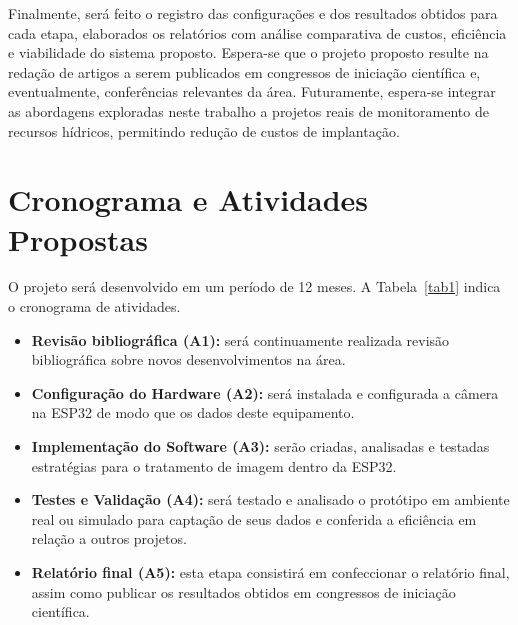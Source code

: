 \documentclass[12pt]{article}
\begin{document}
\begin{spacing}{1}
Finalmente, será feito o registro das configurações e dos resultados obtidos para cada etapa, elaborados os relatórios com análise comparativa de custos, eficiência e viabilidade do sistema proposto.
Espera-se que o projeto proposto resulte na redação de artigos a serem publicados em congressos de iniciação científica e, eventualmente, conferências relevantes da área. Futuramente, espera-se integrar as abordagens exploradas neste trabalho a projetos reais de monitoramento de recursos hídricos, permitindo redução de custos de implantação.

\section{Cronograma e Atividades Propostas}
O projeto será desenvolvido em um período de 12 meses. A Tabela~\ref{tab1} indica o cronograma de atividades.

\begin{itemize}
    
    \item \textbf{Revisão bibliográfica (A1):} será continuamente realizada revisão bibliográfica sobre novos desenvolvimentos na área.
    
    \item \textbf{Configuração do Hardware (A2):} será instalada e configurada a câmera na ESP32 de modo que os dados deste equipamento.

    \item \textbf{Implementação do Software (A3):} serão criadas, analisadas e testadas estratégias para o tratamento de imagem dentro da ESP32. %

    \item \textbf{Testes e Validação (A4):} será testado e analisado o protótipo em ambiente real ou simulado para captação de seus dados e conferida a eficiência em relação a outros projetos.
    
    \item \textbf{Relatório final (A5):} esta etapa consistirá em confeccionar o relatório final, assim como publicar os resultados obtidos em congressos de iniciação científica.
    

\end{itemize}
\end{spacing}
\end{document}
